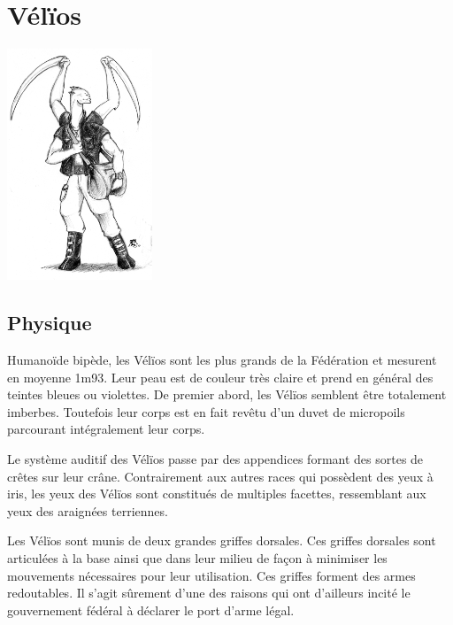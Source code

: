 
\chapter{Vélïos}

\begin{multicols}{2}

\begin{center}
	\includegraphics[width=123pt]{Img/velios}
\end{center}

\section{Physique}

Humanoïde bipède, les Vélïos sont les plus grands de la Fédération et mesurent en moyenne 1m93. Leur peau est de couleur très claire et prend en général des teintes bleues ou violettes. De premier abord, les Vélïos semblent être totalement imberbes. Toutefois leur corps est en fait revêtu d'un duvet de micropoils parcourant intégralement leur corps. 

Le système auditif des Vélïos passe par des appendices formant des sortes de crêtes sur leur crâne. Contrairement aux autres races qui possèdent des yeux à iris, les yeux des Vélïos sont constitués de multiples facettes, ressemblant aux yeux des araignées terriennes. 

Les Vélïos sont munis de deux grandes griffes dorsales. Ces griffes dorsales sont articulées à la base ainsi que dans leur milieu de façon à minimiser les mouvements nécessaires pour leur utilisation. Ces griffes forment des armes redoutables. Il s'agit sûrement d'une des raisons qui ont d'ailleurs incité le gouvernement fédéral à déclarer le port d'arme légal.


\end{multicols}
